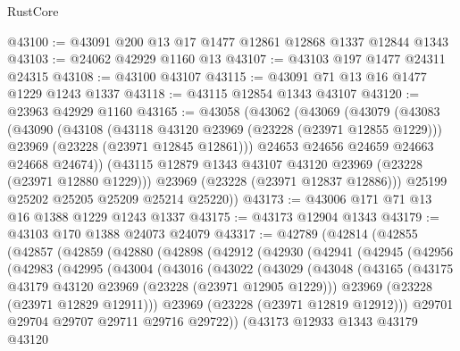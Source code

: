 \begin{lexlean}{RustCore}
\begin{coremodule}
@43100 := @43091 @200 @13 @17 @1477 @12861 @12868 @1337 @12844 @1343
@43103 := @24062 @42929 @1160 @13
@43107 := @43103 @197 @1477 @24311 @24315
@43108 := @43100 @43107
@43115 := @43091 @71 @13 @16 @1477 @1229 @1243 @1337
@43118 := @43115 @12854 @1343 @43107
@43120 := @23963 @42929 @1160
@43165 := @43058
    (@43062
      (@43069
        (@43079
          (@43083
            (@43090
              (@43108
                (@43118 @43120 @23969 (@23228 (@23971 @12855 @1229)))
                @23969
                (@23228 (@23971 @12845 @12861)))
              @24653
              @24656
              @24659
              @24663
              @24668
              @24674))
          (@43115 @12879 @1343 @43107 @43120 @23969 (@23228 (@23971 @12880 @1229)))
          @23969
          (@23228 (@23971 @12837 @12886)))
        @25199
        @25202
        @25205
        @25209
        @25214
        @25220))
@43173 := @43006 @171 @71 @13 @16 @1388 @1229 @1243 @1337
@43175 := @43173 @12904 @1343
@43179 := @43103 @170 @1388 @24073 @24079
@43317 := @42789
    (@42814
      (@42855
        (@42857
          (@42859
            (@42880
              (@42898
                (@42912
                  (@42930
                    (@42941
                      (@42945
                        (@42956
                          (@42983
                            (@42995
                              (@43004
                                (@43016
                                  (@43022
                                    (@43029
                                      (@43048
                                        (@43165
                                          (@43175
                                            @43179
                                            @43120
                                            @23969
                                            (@23228 (@23971 @12905 @1229)))
                                          @23969
                                          (@23228 (@23971 @12829 @12911)))
                                        @23969
                                        (@23228 (@23971 @12819 @12912)))
                                      @29701
                                      @29704
                                      @29707
                                      @29711
                                      @29716
                                      @29722))
                                  (@43173
                                    @12933
                                    @1343
                                    @43179
                                    @43120

\end{coremodule}
\end{lexlean}
